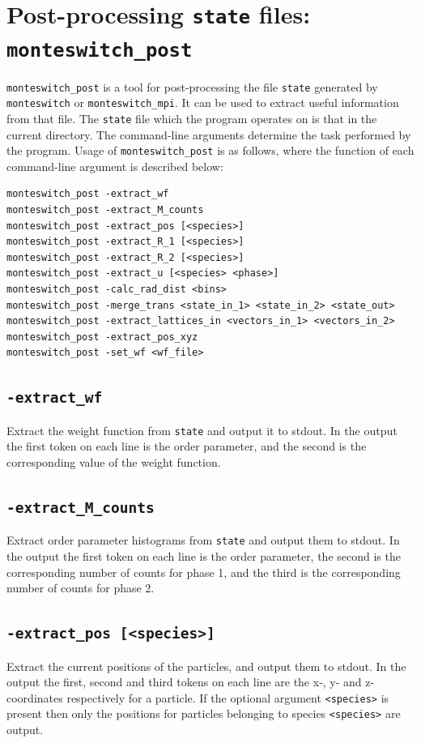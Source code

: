 \documentclass{report}
\begin{document}
\section{Post-processing \texttt{state} files: \texttt{monteswitch\_post}}\label{sec:monteswitch_post}
\texttt{monteswitch\_post} is a tool for post-processing the file \texttt{state} generated by \texttt{monteswitch} or \texttt{monteswitch\_mpi}. It can
be used to extract useful information from that file. The \texttt{state} file which the program operates on is that in the current directory.
The command-line arguments determine the task performed by the program. Usage of \texttt{monteswitch\_post} is as follows, where the function 
of each command-line argument is described below:
\begin{verbatim}
monteswitch_post -extract_wf
monteswitch_post -extract_M_counts
monteswitch_post -extract_pos [<species>]
monteswitch_post -extract_R_1 [<species>]
monteswitch_post -extract_R_2 [<species>]
monteswitch_post -extract_u [<species> <phase>]
monteswitch_post -calc_rad_dist <bins>
monteswitch_post -merge_trans <state_in_1> <state_in_2> <state_out>
monteswitch_post -extract_lattices_in <vectors_in_1> <vectors_in_2>
monteswitch_post -extract_pos_xyz
monteswitch_post -set_wf <wf_file>
\end{verbatim}

\subsection{\texttt{-extract\_wf}}
Extract the weight function from \texttt{state} and output it to stdout. In the output the first token on each line is the order parameter, 
and the second is the corresponding value of the weight function.

\subsection{\texttt{-extract\_M\_counts}}
Extract order parameter histograms from \texttt{state} and output them to stdout. In the output the first token on each line is the order 
parameter, the second is the corresponding number of counts for phase 1, and the third is the corresponding number of counts for 
phase 2. 

\subsection{\texttt{-extract\_pos [<species>]}}
Extract the current positions of the particles, and output them to stdout. In the output the first, second and third tokens on each line 
are the x-, y- and z-coordinates respectively for a particle. If the optional argument \texttt{<species>} is present then only the positions
for particles belonging to species \texttt{<species>} are output.
\end{document}
